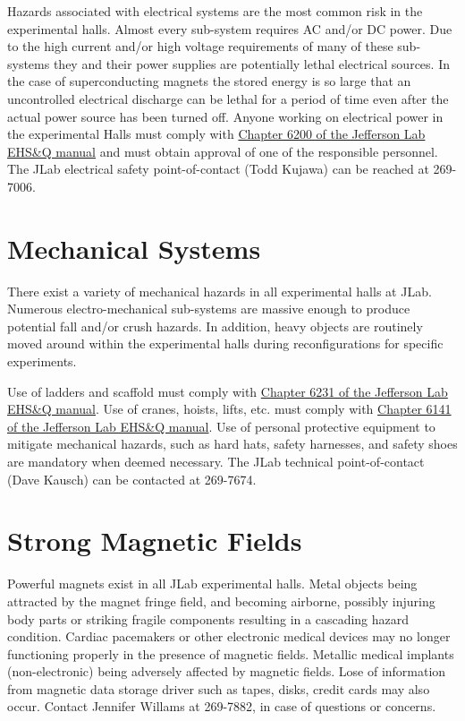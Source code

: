 {{	Hazards associated with electrical systems are the most common risk in the experimental halls. 
Almost every sub-system requires AC and/or DC power. Due to the high current and/or high voltage 
requirements of many of these sub-systems they and their power supplies are potentially lethal 
electrical sources. In the case of superconducting magnets the stored energy is so large that 
an uncontrolled electrical discharge can be lethal for a period of time even after the actual 
power source has been turned off.  Anyone working on electrical power in the experimental Halls 
must comply with \href{http://www.jlab.org/ehs/ehsmanual/manual/6200.html}{Chapter 6200 of the Jefferson Lab EHS\&Q manual}
and must obtain approval of one of the responsible personnel. 
The JLab electrical safety point-of-contact (Todd Kujawa) can be reached at 269-7006.

\section{Mechanical Systems}

	There exist a variety of mechanical hazards in all experimental halls at JLab. 
Numerous electro-mechanical sub-systems are massive enough to produce potential fall 
and/or crush hazards.  In addition, heavy objects are routinely moved around within 
the experimental halls during reconfigurations for specific experiments. 

Use of ladders and scaffold must comply 
with \href{http://www.jlab.org/ehs/ehsmanual/manual/6132.html}{Chapter 6231 of the 
Jefferson Lab EHS\&Q manual}.
Use of cranes, hoists, lifts, etc. must comply with
\href{http://www.jlab.org/ehs/ehsmanual/manual/6141.html}{Chapter 6141 of the 
Jefferson Lab EHS\&Q manual}. 
Use of personal protective equipment 
to mitigate mechanical hazards, such as hard hats, safety harnesses, and safety 
shoes are mandatory when deemed necessary.
The JLab technical point-of-contact (Dave Kausch) can be contacted at 269-7674.


\section{Strong Magnetic Fields}

	Powerful magnets exist in all JLab experimental halls. Metal objects being attracted 
by the magnet fringe field, and becoming airborne, possibly injuring body parts or striking 
fragile components resulting in a cascading hazard condition. Cardiac pacemakers or other 
electronic medical devices may no longer functioning properly in the presence of magnetic fields. 
Metallic medical implants (non-electronic) being adversely affected by magnetic fields. Lose of 
information from magnetic data storage driver such as tapes, disks, credit cards may also occur. 
Contact Jennifer Willams at 269-7882, in case of questions or concerns.

}}
